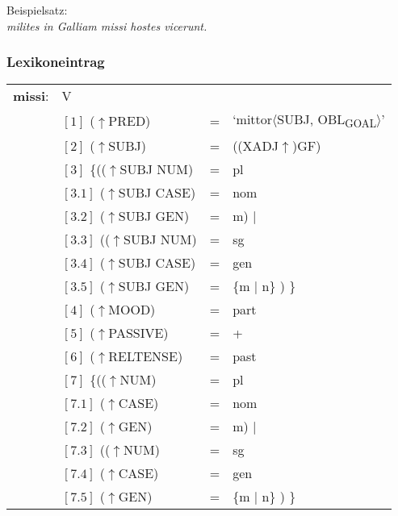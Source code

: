 \documentclass[12pt,a4paper]{article}
\begin{document}
Beispielsatz:\\
\textit{milites in Galliam missi hostes vicerunt.} \\

\subsubsection{Lexikoneintrag}
\begin{singlespace}
\begin{tabular}{ l  l  l  l  } 
\textbf{missi}: & V \\
$\qquad$ & $[1]$ \:  ($\uparrow$PRED) & = & `mittor$\langle$SUBJ, OBL\textsubscript{GOAL}$\rangle$'\\
$\qquad$ & $[2]$ \:  ($\uparrow$SUBJ) & = & ((XADJ$\uparrow$)GF) \\
$\qquad$ & $[3]$ \:  \{(($\uparrow$SUBJ NUM) & = & pl \\ 
$\qquad$ & $[3.1]$ \:  ($\uparrow$SUBJ CASE) & = & nom \\
$\qquad$ & $[3.2]$ \:  ($\uparrow$SUBJ GEN) & = & m) $\mid$\\
$\qquad$ & $[3.3]$ \:  (($\uparrow$SUBJ NUM) & = & sg \\ 
$\qquad$ & $[3.4]$ \: ($\uparrow$SUBJ CASE) & = & gen \\
$\qquad$ & $[3.5]$ \:  ($\uparrow$SUBJ GEN) & = & \{m $\mid$ n\} ) \} \\
$\qquad$ & $[4]$ \:  ($\uparrow$MOOD) & = & part \\
$\qquad$ & $[5]$ \:  ($\uparrow$PASSIVE) & = & + \\
$\qquad$ & $[6]$ \: ($\uparrow$RELTENSE) & = & past \\
$\qquad$ & $[7]$ \:  \{(($\uparrow$NUM) & = & pl \\ 
$\qquad$ & $[7.1]$ \:  ($\uparrow$CASE) & = & nom \\
$\qquad$ & $[7.2]$ \:  ($\uparrow$GEN) & = & m) $\mid$\\
$\qquad$ & $[7.3]$ \:  (($\uparrow$NUM) & = & sg \\ 
$\qquad$ & $[7.4]$ \: ($\uparrow$CASE) & = & gen \\
$\qquad$ & $[7.5]$ \:  ($\uparrow$GEN) & = & \{m $\mid$ n\} ) \} \\
\end{tabular}
\end{singlespace}
\end{document}
